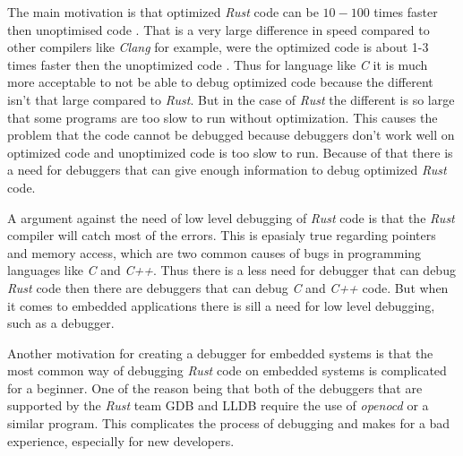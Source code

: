 


The main motivation is that optimized \emph{Rust} code can be $10-100$ times faster then unoptimised code \cite{perf-book}.
That is a very large difference in speed compared to other compilers like \emph{Clang} for example, were the optimized code is about 1-3 times faster then the unoptimized code \cite{clang-opt}.
Thus for language like \emph{C} it is much more acceptable to not be able to debug optimized code because the different isn't that large compared to \emph{Rust}.
But in the case of \emph{Rust} the different is so large that some programs are too slow to run without optimization.
This causes the problem that the code cannot be debugged because debuggers don't work well on optimized code and unoptimized code is too slow to run.
Because of that there is a need for debuggers that can give enough information to debug optimized \emph{Rust} code.


A argument against the need of low level debugging of \emph{Rust} code is that the \emph{Rust} compiler will catch most of the errors.
This is epasialy true regarding pointers and memory access, which are two common causes of bugs in programming languages like \emph{C} and \emph{C++}. 
Thus there is a less need for debugger that can debug \emph{Rust} code then there are debuggers that can debug \emph{C} and \emph{C++} code.
But when it comes to embedded applications there is sill a need for low level debugging, such as a debugger.


Another motivation for creating a debugger for embedded systems is that the most common way of debugging \emph{Rust} code on embedded systems is complicated for a beginner.
One of the reason being that both of the debuggers that are supported by the \emph{Rust} team \gls{GDB} and \gls{LLDB} require the use of \emph{openocd} or a similar program.
This complicates the process of debugging and makes for a bad experience, especially for new developers.


